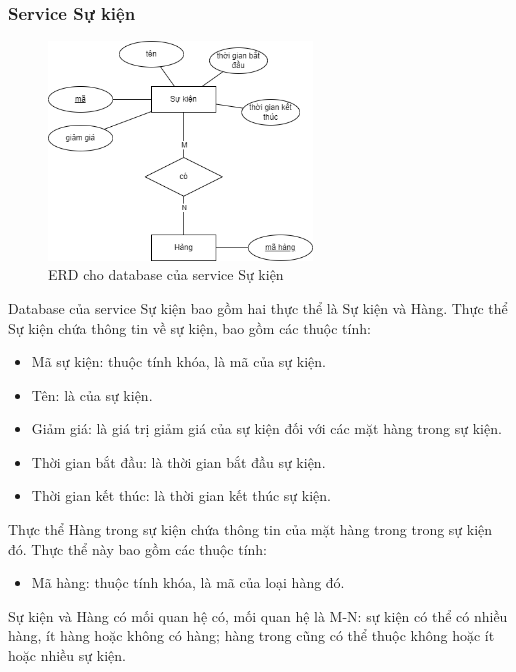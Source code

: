 \newpage

\subsubsection{Service Sự kiện}
\begin{figure}[!htp]
	\begin{center}
		\includegraphics[width=7cm]{img/database/erd/eerd-event.png}
		\newline
		\caption{ERD cho database của service Sự kiện}
	\end{center}
\end{figure}

\par Database của service Sự kiện bao gồm hai thực thể là Sự kiện và Hàng. Thực thể Sự kiện chứa thông tin về sự kiện, bao gồm các thuộc tính:
\begin{itemize}
	\item Mã sự kiện: thuộc tính khóa, là mã của sự kiện.
	\item Tên: là của sự kiện.
	\item Giảm giá: là giá trị giảm giá của sự kiện đối với các mặt hàng trong sự kiện.
	\item Thời gian bắt đầu: là thời gian bắt đầu sự kiện.
	\item Thời gian kết thúc: là thời gian kết thúc sự kiện.
\end{itemize}

\par Thực thể Hàng trong sự kiện chứa thông tin của mặt hàng trong trong sự kiện đó. Thực thể này bao gồm các thuộc tính:
\begin{itemize}
	\item Mã hàng: thuộc tính khóa, là mã của loại hàng đó.
\end{itemize}

\par Sự kiện và Hàng có mối quan hệ có, mối quan hệ là M-N: sự kiện có thể có nhiều hàng, ít hàng hoặc không có hàng; hàng trong cũng có thể thuộc không hoặc ít hoặc nhiều sự kiện.

